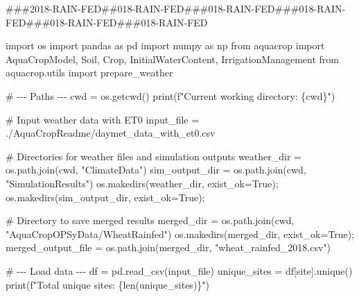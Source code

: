 \documentclass[
  letterpaper,
  DIV=11,
  numbers=noendperiod]{scrartcl}
\newenvironment{Shaded}{\begin{snugshade}}{\end{snugshade}}
\newcommand{\BuiltInTok}[1]{\textcolor[rgb]{0.00,0.23,0.31}{#1}}
\newcommand{\CommentTok}[1]{\textcolor[rgb]{0.37,0.37,0.37}{#1}}
\newcommand{\ImportTok}[1]{\textcolor[rgb]{0.00,0.46,0.62}{#1}}
\newcommand{\NormalTok}[1]{\textcolor[rgb]{0.00,0.23,0.31}{#1}}
\newcommand{\OperatorTok}[1]{\textcolor[rgb]{0.37,0.37,0.37}{#1}}
\newcommand{\SpecialCharTok}[1]{\textcolor[rgb]{0.37,0.37,0.37}{#1}}
\newcommand{\SpecialStringTok}[1]{\textcolor[rgb]{0.13,0.47,0.30}{#1}}
\newcommand{\StringTok}[1]{\textcolor[rgb]{0.13,0.47,0.30}{#1}}
\newcommand{\VariableTok}[1]{\textcolor[rgb]{0.07,0.07,0.07}{#1}}
\begin{document}
\begin{Shaded}
\begin{Highlighting}[]
\CommentTok{\#\#\#2018{-}RAIN{-}FED\#\#018{-}RAIN{-}FED\#\#\#018{-}RAIN{-}FED\#\#\#018{-}RAIN{-}FED\#\#\#018{-}RAIN{-}FED\#\#\#018{-}RAIN{-}FED}

\ImportTok{import}\NormalTok{ os}
\ImportTok{import}\NormalTok{ pandas }\ImportTok{as}\NormalTok{ pd}
\ImportTok{import}\NormalTok{ numpy }\ImportTok{as}\NormalTok{ np}
\ImportTok{from}\NormalTok{ aquacrop }\ImportTok{import}\NormalTok{ AquaCropModel, Soil, Crop, InitialWaterContent, IrrigationManagement}
\ImportTok{from}\NormalTok{ aquacrop.utils }\ImportTok{import}\NormalTok{ prepare\_weather}

\CommentTok{\# {-}{-}{-} Paths {-}{-}{-}}
\NormalTok{cwd }\OperatorTok{=}\NormalTok{ os.getcwd()}
\BuiltInTok{print}\NormalTok{(}\SpecialStringTok{f"Current working directory: }\SpecialCharTok{\{}\NormalTok{cwd}\SpecialCharTok{\}}\SpecialStringTok{"}\NormalTok{)}
\end{Highlighting}
\end{Shaded}

\begin{Shaded}
\begin{Highlighting}[]
\CommentTok{\# Input weather data with ET0}
\NormalTok{input\_file }\OperatorTok{=} \StringTok{\textquotesingle{}./AquaCropReadme/daymet\_data\_with\_et0.csv\textquotesingle{}}

\CommentTok{\# Directories for weather files and simulation outputs}
\NormalTok{weather\_dir }\OperatorTok{=}\NormalTok{ os.path.join(cwd, }\StringTok{"ClimateData"}\NormalTok{)}
\NormalTok{sim\_output\_dir }\OperatorTok{=}\NormalTok{ os.path.join(cwd, }\StringTok{"SimulationResults"}\NormalTok{)}
\NormalTok{os.makedirs(weather\_dir, exist\_ok}\OperatorTok{=}\VariableTok{True}\NormalTok{)}\OperatorTok{;}
\NormalTok{os.makedirs(sim\_output\_dir, exist\_ok}\OperatorTok{=}\VariableTok{True}\NormalTok{)}\OperatorTok{;}


\CommentTok{\# Directory to save merged results}
\NormalTok{merged\_dir }\OperatorTok{=}\NormalTok{ os.path.join(cwd, }\StringTok{"AquaCropOPSyData/WheatRainfed"}\NormalTok{)}
\NormalTok{os.makedirs(merged\_dir, exist\_ok}\OperatorTok{=}\VariableTok{True}\NormalTok{)}\OperatorTok{;}
\NormalTok{merged\_output\_file }\OperatorTok{=}\NormalTok{ os.path.join(merged\_dir, }\StringTok{"wheat\_rainfed\_2018.csv"}\NormalTok{)}

\CommentTok{\# {-}{-}{-} Load data {-}{-}{-}}
\NormalTok{df }\OperatorTok{=}\NormalTok{ pd.read\_csv(input\_file)}
\NormalTok{unique\_sites }\OperatorTok{=}\NormalTok{ df[}\StringTok{\textquotesingle{}site\textquotesingle{}}\NormalTok{].unique()}
\BuiltInTok{print}\NormalTok{(}\SpecialStringTok{f"Total unique sites: }\SpecialCharTok{\{}\BuiltInTok{len}\NormalTok{(unique\_sites)}\SpecialCharTok{\}}\SpecialStringTok{"}\NormalTok{)}
\end{Highlighting}
\end{Shaded}
\end{document}
